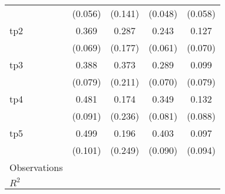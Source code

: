 {\begin{tabular}{l*{4}{c}}
                    &     (0.056)         &     (0.141)         &     (0.048)         &     (0.058)         \\
[1em]
tp2                 &       0.369\sym{***}&       0.287         &       0.243\sym{***}&       0.127\sym{*}  \\
                    &     (0.069)         &     (0.177)         &     (0.061)         &     (0.070)         \\
[1em]
tp3                 &       0.388\sym{***}&       0.373\sym{*}  &       0.289\sym{***}&       0.099         \\
                    &     (0.079)         &     (0.211)         &     (0.070)         &     (0.079)         \\
[1em]
tp4                 &       0.481\sym{***}&       0.174         &       0.349\sym{***}&       0.132         \\
                    &     (0.091)         &     (0.236)         &     (0.081)         &     (0.088)         \\
[1em]
tp5                 &       0.499\sym{***}&       0.196         &       0.403\sym{***}&       0.097         \\
                    &     (0.101)         &     (0.249)         &     (0.090)         &     (0.094)         \\
\hline
Observations        &                     &                     &                     &                     \\
\(R^{2}\)           &                     &                     &                     &                     \\
\hline\hline
\end{tabular}
}
